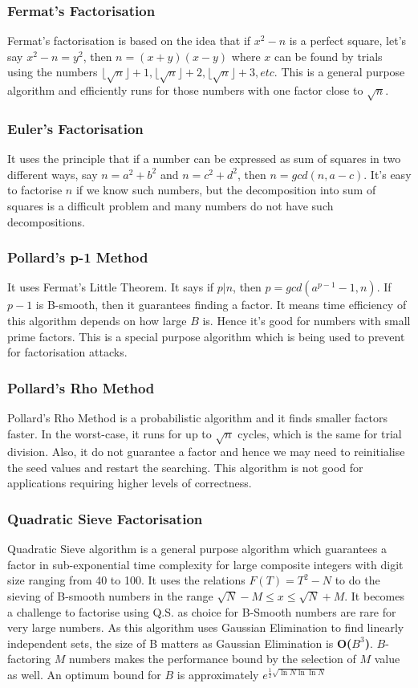 \documentclass[11pt,a4paper,fleqn]{article}
\begin{document}
\begin{enumerate}[1.]
\begin{flushleft}
            \subsubsection*{Fermat's Factorisation} Fermat's factorisation is based on the idea that if $x^2 - n$ is a perfect square, let's say $x^2 - n = y^2$, then $n = (x + y)(x - y)$ where $x$ can be found by trials using the numbers  $\lfloor\sqrt{n}\rfloor + 1, \lfloor\sqrt{n}\rfloor + 2, \lfloor\sqrt{n}\rfloor + 3, etc$. This is a general purpose algorithm and efficiently runs for those numbers with one factor close to $\sqrt{n}$.
            \subsubsection*{Euler's Factorisation} It uses the principle that if a number can be expressed as sum of squares in two different ways, say $n = a^2 + b^2$ and $n = c^2 + d^2$, then $n = gcd(n, a - c)$. It's easy to factorise $n$ if we know such numbers, but the decomposition into sum of squares is a difficult problem and many numbers do not have such decompositions.
            \subsubsection*{Pollard's p-1 Method} It uses Fermat's Little Theorem. It says if $p|n$, then $p = gcd(a^{p - 1} - 1, n)$.  If $p - 1$ is B-smooth, then it guarantees finding a factor. It means time efficiency of this algorithm depends on how large $B$ is. Hence it's good for numbers with small prime factors. This is a special purpose algorithm which is being used to prevent for factorisation attacks.
            \subsubsection*{Pollard's Rho Method} Pollard's Rho Method is a probabilistic algorithm and it finds smaller factors faster. In the worst-case, it runs for up to $\sqrt{n}$ cycles, which is the same for trial division. Also, it do not guarantee a factor and hence we may need to reinitialise the seed values and restart the searching. This algorithm is not good for applications requiring higher levels of correctness.
            \subsubsection*{Quadratic Sieve Factorisation} Quadratic Sieve algorithm is a general purpose algorithm which guarantees a factor in sub-exponential time complexity for large composite integers with digit size ranging from 40 to 100. It uses the relations $F(T) = T^2 - N$ to do the sieving of B-smooth numbers in the range $\sqrt{N} - M \le x \le \sqrt{N} + M$. It becomes a challenge to factorise using Q.S. as choice for B-Smooth numbers are rare for very large numbers. As this algorithm uses Gaussian Elimination to find linearly independent sets, the size of B matters as Gaussian Elimination is \textbf{O($B^3$)}. $B$-factoring $M$ numbers makes the performance bound by the selection of $M$ value as well. An optimum bound for $B$ is approximately \cite{number_theory_3} $e^{\frac{1}{2}\sqrt{\ln N \ln \ln N}}$

\end{flushleft}
\end{enumerate}
\end{document}
